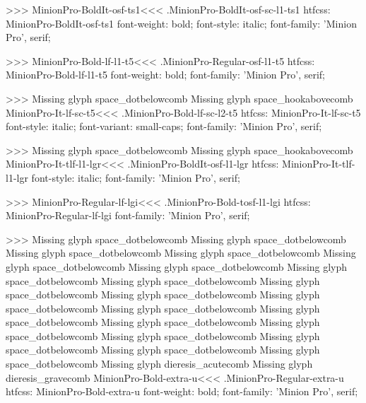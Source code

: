 {>>>
\<MinionPro-BoldIt-osf-ts1\><<<
.MinionPro-BoldIt-osf-sc-l1-ts1
htfcss:  MinionPro-BoldIt-osf-ts1  font-weight: bold; font-style: italic; font-family: 'Minion Pro', serif;

>>>
\<MinionPro-Bold-lf-l1-t5\><<<
.MinionPro-Regular-osf-l1-t5
htfcss:  MinionPro-Bold-lf-l1-t5  font-weight: bold; font-family: 'Minion Pro', serif;

>>>
Missing glyph	space_dotbelowcomb
Missing glyph	space_hookabovecomb
\<MinionPro-It-lf-sc-t5\><<<
.MinionPro-Bold-lf-sc-l2-t5
htfcss:  MinionPro-It-lf-sc-t5  font-style: italic; font-variant: small-caps; font-family: 'Minion Pro', serif;

>>>
Missing glyph	space_dotbelowcomb
Missing glyph	space_hookabovecomb
\<MinionPro-It-tlf-l1-lgr\><<<
.MinionPro-BoldIt-osf-l1-lgr
htfcss:  MinionPro-It-tlf-l1-lgr  font-style: italic; font-family: 'Minion Pro', serif;

>>>
\<MinionPro-Regular-lf-lgi\><<<
.MinionPro-Bold-tosf-l1-lgi
htfcss:  MinionPro-Regular-lf-lgi  font-family: 'Minion Pro', serif;

>>>
Missing glyph	space_dotbelowcomb
Missing glyph	space_dotbelowcomb
Missing glyph	space_dotbelowcomb
Missing glyph	space_dotbelowcomb
Missing glyph	space_dotbelowcomb
Missing glyph	space_dotbelowcomb
Missing glyph	space_dotbelowcomb
Missing glyph	space_dotbelowcomb
Missing glyph	space_dotbelowcomb
Missing glyph	space_dotbelowcomb
Missing glyph	space_dotbelowcomb
Missing glyph	space_dotbelowcomb
Missing glyph	space_dotbelowcomb
Missing glyph	space_dotbelowcomb
Missing glyph	space_dotbelowcomb
Missing glyph	space_dotbelowcomb
Missing glyph	space_dotbelowcomb
Missing glyph	space_dotbelowcomb
Missing glyph	space_dotbelowcomb
Missing glyph	dieresis_acutecomb
Missing glyph	dieresis_gravecomb
\<MinionPro-Bold-extra-u\><<<
.MinionPro-Regular-extra-u
htfcss:  MinionPro-Bold-extra-u  font-weight: bold; font-family: 'Minion Pro', serif;

}
